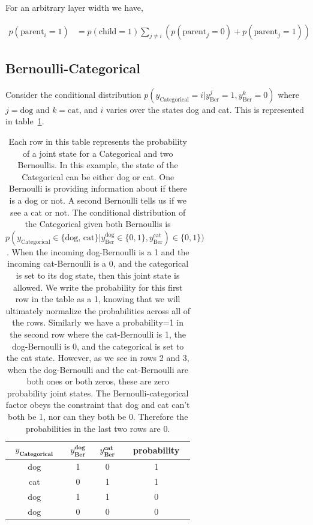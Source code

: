 \documentclass{article}
\begin{document}
For an arbitrary layer width we have,

\begin{align}
    p(\text{parent}_i = 1) &=  
    p(\text{child}=1) \sum_{j\neq i} \left( p(\text{parent}_j=0) + p(\text{parent}_j=1) \right)
\end{align}


\subsection{Bernoulli-Categorical}\label{appendix:Bernoulli-Categorical}

Consider the conditional distribution $p(y_{\text{Categorical}}=i|y^j_{\text{Ber}}=1, y^k_{\text{Ber}}=0)$ where $j=\text{dog}$ and $k=\text{cat}$, and $i$ varies over the states dog and cat. This is represented in table~\ref{tab:Bernoulli-categorical}.

\begin{table}[H]
    \setlength{\extrarowheight}{5pt}
    \centering
    \begin{tabular}{c|c|c|c}
        \hline\hline
        \textbf{$y_{\textbf{Categorical}}$} & \textbf{$y^{\textbf{dog}}_{\textbf{Ber}}$} & \textbf{$y^{\textbf{cat}}_{\textbf{Ber}}$} & \textbf{probability} \\[1ex]
        \hline
        dog    & 1          & 0          & 1 \\
        cat    & 0          & 1          & 1 \\
        dog    & 1          & 1          & 0 \\
        dog    & 0          & 0          & 0 \\[1ex]
        \hline
    \end{tabular}
    \caption{Each row in this table represents the probability of a joint state for a Categorical and two Bernoullis. In this example, the state of the Categorical can be either dog or cat. One Bernoulli is providing information about if there is a dog or not.  A second Bernoulli tells us if we see a cat or not.  The conditional distribution of the Categorical given both Bernoullis is $p(y_{\text{Categorical}} \in \{\text{dog, cat}\}|y^\text{dog}_{\text{Ber}} \in \{0,1\}, y^\text{cat}_{\text{Ber}}) \in \{0,1\})$.  When the incoming dog-Bernoulli is a 1 and the incoming cat-Bernoulli is a 0, and the categorical is set to its dog state, then this joint state is allowed.  We write the probability for this first row in the table as a 1, knowing that we will ultimately normalize the probabilities across all of the rows.  Similarly we have a probability=1 in the second row where the cat-Bernoulli is 1, the dog-Bernoulli is 0, and the categorical is set to the cat state.  However, as we see in rows 2 and 3, when the dog-Bernoulli and the cat-Bernoulli are both ones or both zeros, these are zero probability joint states.  The Bernoulli-categorical factor obeys the constraint that dog and cat can't both be 1, nor can they both be 0.  Therefore the probabilities in the last two rows are 0.}
    \label{tab:Bernoulli-categorical}
\end{table}
\end{document}
